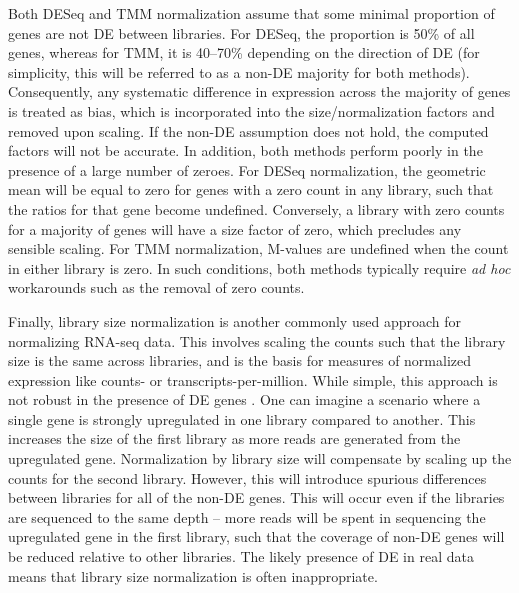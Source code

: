 \documentclass{bmcart}
\begin{document}
Both DESeq and TMM normalization assume that some minimal proportion of genes are not DE between libraries.
For DESeq, the proportion is 50\% of all genes, whereas for TMM, it is 40--70\% depending on the direction of DE (for simplicity, this will be referred to as a non-DE majority for both methods).
Consequently, any systematic difference in expression across the majority of genes is treated as bias, which is incorporated into the size/normalization factors and removed upon scaling.
If the non-DE assumption does not hold, the computed factors will not be accurate.
In addition, both methods perform poorly in the presence of a large number of zeroes.
For DESeq normalization, the geometric mean will be equal to zero for genes with a zero count in any library, such that the ratios for that gene become undefined.
Conversely, a library with zero counts for a majority of genes will have a size factor of zero, which precludes any sensible scaling.
For TMM normalization, M-values are undefined when the count in either library is zero.
In such conditions, both methods typically require \textit{ad hoc} workarounds such as the removal of zero counts.

Finally, library size normalization is another commonly used approach for normalizing RNA-seq data.
This involves scaling the counts such that the library size is the same across libraries,
    and is the basis for measures of normalized expression like counts- or transcripts-per-million.
While simple, this approach is not robust in the presence of DE genes \cite{robinson2010scaling}.
One can imagine a scenario where a single gene is strongly upregulated in one library compared to another.
This increases the size of the first library as more reads are generated from the upregulated gene.
Normalization by library size will compensate by scaling up the counts for the second library.
However, this will introduce spurious differences between libraries for all of the non-DE genes.
This will occur even if the libraries are sequenced to the same depth 
    -- more reads will be spent in sequencing the upregulated gene in the first library, such that the coverage of non-DE genes will be reduced relative to other libraries.
The likely presence of DE in real data means that library size normalization is often inappropriate.
\end{document}
